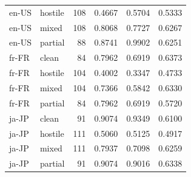 \begin{longtable}{llrrrr}
en-US & hostile & 108 & 0.4667 & 0.5704 & 0.5333 \\  %
en-US & mixed & 108 & 0.8068 & 0.7727 & 0.6267 \\  %
en-US & partial & 88 & 0.8741 & 0.9902 & 0.6251 \\  %
fr-FR & clean & 84 & 0.7962 & 0.6919 & 0.6373 \\  %
fr-FR & hostile & 104 & 0.4002 & 0.3347 & 0.4733 \\  %
fr-FR & mixed & 104 & 0.7366 & 0.5842 & 0.6330 \\  %
fr-FR & partial & 84 & 0.7962 & 0.6919 & 0.5720 \\  %
ja-JP & clean & 91 & 0.9074 & 0.9349 & 0.6100 \\  %
ja-JP & hostile & 111 & 0.5060 & 0.5125 & 0.4917 \\  %
ja-JP & mixed & 111 & 0.7937 & 0.7098 & 0.6259 \\  %
ja-JP & partial & 91 & 0.9074 & 0.9016 & 0.6338 \\  %
\end{longtable}
\par\smallskip{}
